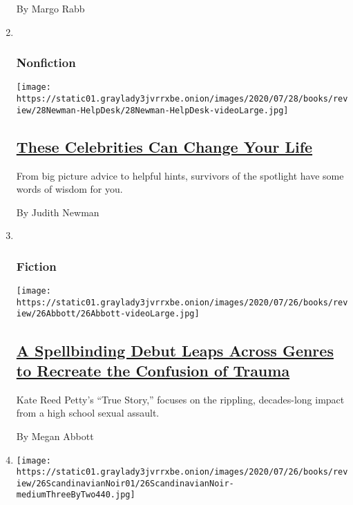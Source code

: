 \begin{enumerate}
  By Margo Rabb
\item ~
  \hypertarget{nonfiction-4}{%
  \subsubsection{Nonfiction}\label{nonfiction-4}}

  \texttt{[image: https://static01.graylady3jvrrxbe.onion/images/2020/07/28/books/review/28Newman-HelpDesk/28Newman-HelpDesk-videoLarge.jpg]}

  \hypertarget{these-celebrities-can-change-your-life}{%
  \subsection{\texorpdfstring{\href{/2020/07/28/books/review/hustle-harder-hustle-smarter-curtis-jackson.html}{These
  Celebrities Can Change Your
  Life}}{These Celebrities Can Change Your Life}}\label{these-celebrities-can-change-your-life}}

  From big picture advice to helpful hints, survivors of the spotlight
  have some words of wisdom for you.

  By Judith Newman
\item ~
  \hypertarget{fiction-2}{%
  \subsubsection{Fiction}\label{fiction-2}}

  \texttt{[image: https://static01.graylady3jvrrxbe.onion/images/2020/07/26/books/review/26Abbott/26Abbott-videoLarge.jpg]}

  \hypertarget{a-spellbinding-debut-leaps-across-genres-to-recreate-the-confusion-of-trauma}{%
  \subsection{\texorpdfstring{\href{/2020/07/24/books/review/kate-reed-petty-true-story.html}{A
  Spellbinding Debut Leaps Across Genres to Recreate the Confusion of
  Trauma}}{A Spellbinding Debut Leaps Across Genres to Recreate the Confusion of Trauma}}\label{a-spellbinding-debut-leaps-across-genres-to-recreate-the-confusion-of-trauma}}

  Kate Reed Petty's ``True Story,'' focuses on the rippling,
  decades-long impact from a high school sexual assault.

  By Megan Abbott
\item
  \texttt{[image: https://static01.graylady3jvrrxbe.onion/images/2020/07/26/books/review/26ScandinavianNoir01/26ScandinavianNoir-mediumThreeByTwo440.jpg]}


\end{enumerate}
